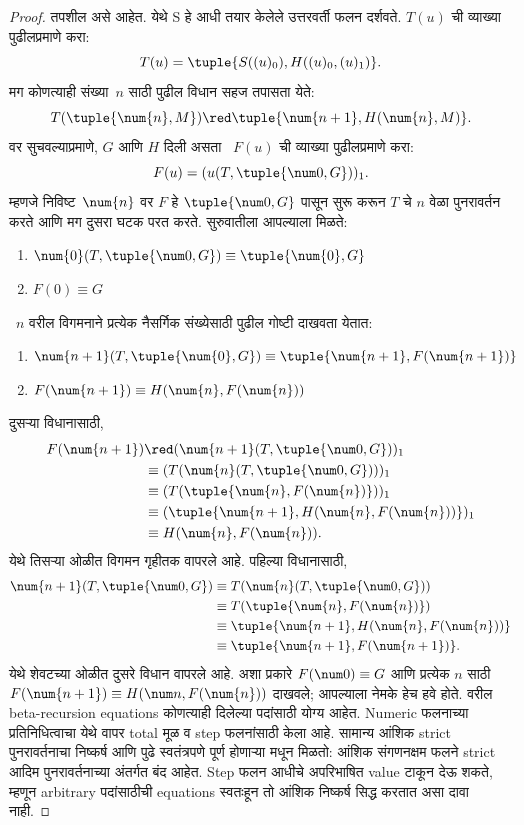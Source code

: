 \documentclass[../../../include/open-logic-section]{subfiles}
\begin{document}
\begin{proof}
तपशील असे आहेत. येथे S हे आधी तयार केलेले उत्तरवर्ती
फलन दर्शवते. $T(u)$ ची व्याख्या पुढीलप्रमाणे करा:
\[
T(u) = \tuple{S((u)_0), H((u)_0,(u)_1)}.
\]
मग कोणत्याही संख्या~$n$ साठी पुढील विधान सहज तपासता येते:
\[
T(\tuple{\num{n}, M}) \red \tuple{\num{n+1}, H(\num{n}, M)}.
\]
वर सुचवल्याप्रमाणे, $G$ आणि $H$ दिली असता
~$F(u)$ ची व्याख्या पुढीलप्रमाणे करा:
\[
F(u) = (u(T,\tuple{\num 0, G}))_1.
\]
म्हणजे निविष्ट~$\num{n}$ वर $F$ हे
$\tuple{\num 0, G}$ पासून सुरू करून $T$ चे $n$
वेळा पुनरावर्तन करते आणि मग दुसरा घटक परत करते.
सुरुवातीला आपल्याला मिळते:
\begin{enumerate}
\item $\num{0} (T, \tuple{\num 0, G}) \equiv \tuple{\num{0}, G}$
\item $F(\num{0}) \equiv G$
\end{enumerate}
~$n$ वरील विगमनाने प्रत्येक नैसर्गिक संख्येसाठी
पुढील गोष्टी दाखवता येतात:
\begin{enumerate}
\item $\num{n+1}(T, \tuple{\num{0}, G}) \equiv \tuple{\num{n+1}, F(\num{n+1})}$
\item $F(\num{n+1}) \equiv H(\num{n}, F(\num{n}))$
\end{enumerate}
दुसऱ्या विधानासाठी,
\begin{align*}
F(\num{n+1}) & \red (\num{n+1}(T, \tuple{\num 0, G}))_1 \\
& \equiv (T(\num{n} (T, \tuple{\num 0, G})))_1 \\
& \equiv (T(\tuple{\num{n}, F(\num{n})}))_1 \\
& \equiv (\tuple{\num{n+1}, H(\num{n}, F(\num{n}))})_1 \\
& \equiv H(\num{n}, F(\num{n})).
\end{align*}
येथे तिसऱ्या ओळीत विगमन गृहीतक वापरले आहे.
पहिल्या विधानासाठी,
\begin{align*}
\num{n+1} (T, \tuple{\num 0, G}) &
\equiv T(\num{n} (T, \tuple{\num 0, G})) \\
& \equiv T( \tuple{\num{n}, F(\num{n})}) \\
& \equiv \tuple{\num{n+1}, H(\num{n}, F(\num{n}))} \\
& \equiv \tuple{\num{n+1}, F(\num{n+1})}.
\end{align*}
येथे शेवटच्या ओळीत दुसरे विधान वापरले आहे.
अशा प्रकारे $F(\num 0) \equiv G$ आणि प्रत्येक $n$
साठी $F(\num {n+1}) \equiv H(\num
n, F(\num{n}))$ दाखवले; आपल्याला नेमके हेच हवे होते.
वरील beta-recursion equations कोणत्याही दिलेल्या पदांसाठी
योग्य आहेत. Numeric फलनाच्या प्रतिनिधित्वाचा येथे वापर
total मूळ व step फलनांसाठी केला आहे. सामान्य आंशिक
strict पुनरावर्तनाचा निष्कर्ष 
आणि पुढे स्वतंत्रपणे पूर्ण होणाऱ्या
 मधून मिळतो: आंशिक
संगणनक्षम फलने strict आदिम पुनरावर्तनाच्या अंतर्गत बंद आहेत.
Step फलन आधीचे अपरिभाषित value टाकून देऊ शकते,
म्हणून arbitrary पदांसाठीची equations स्वतःहून तो
आंशिक निष्कर्ष सिद्ध करतात असा दावा नाही.
\end{proof}
\end{document}

